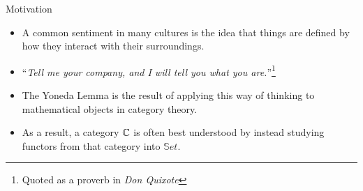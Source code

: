 \begin{frame}{Motivation}
 \begin{itemize}
  \item A common sentiment in many cultures is the idea that things are defined by how they interact with their surroundings.
  \pause\item ``\textit{Tell me your company, and I will tell you what you are.}''\footnote{Quoted as a proverb in \textit{Don Quixote}}
  \pause\item The Yoneda Lemma is the result of applying this way of thinking to mathematical objects in category theory.
  \pause\item As a result, a category $\mathbb{C}$ is often best understood by instead studying functors from that category into $\mathbb{S}et$.
 \end{itemize}
\end{frame}

